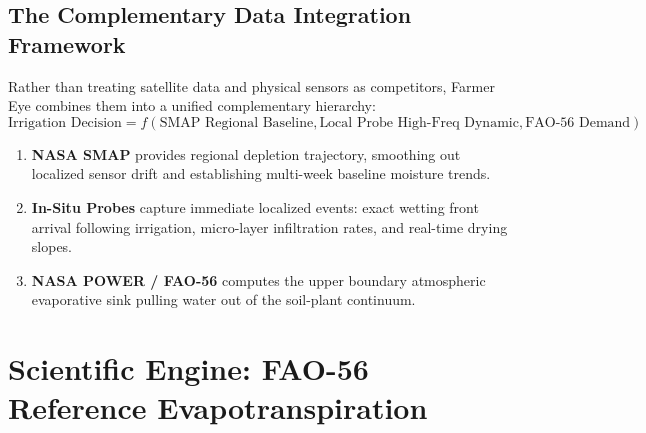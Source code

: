 \documentclass[11pt,a4paper,oneside]{report}
\begin{document}
\section{The Complementary Data Integration Framework}
Rather than treating satellite data and physical sensors as competitors, Farmer Eye combines them into a unified complementary hierarchy:
\begin{equation}
\text{Irrigation Decision} = f\left( \text{SMAP Regional Baseline}, \text{Local Probe High-Freq Dynamic}, \text{FAO-56 Demand} \right)
\end{equation}
\begin{enumerate}
    \item \textbf{NASA SMAP} provides regional depletion trajectory, smoothing out localized sensor drift and establishing multi-week baseline moisture trends.
    \item \textbf{In-Situ Probes} capture immediate localized events: exact wetting front arrival following irrigation, micro-layer infiltration rates, and real-time drying slopes.
    \item \textbf{NASA POWER / FAO-56} computes the upper boundary atmospheric evaporative sink pulling water out of the soil-plant continuum.
\end{enumerate}

\chapter{Scientific Engine: FAO-56 Reference Evapotranspiration}
\end{document}
